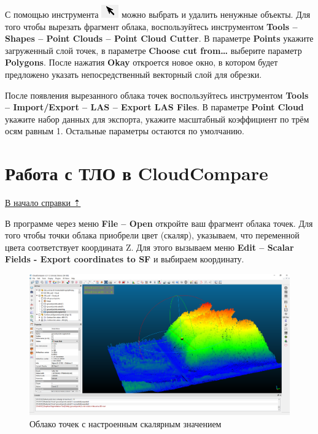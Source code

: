 \documentclass[
  12pt,
]{book}
\begin{document}
С помощью инструмента \includegraphics{images/Ref19/Pick.png} можно выбрать и удалить ненужные объекты. Для того чтобы вырезать фрагмент облака, воспользуйтесь инструментом \textbf{Tools -- Shapes -- Point Clouds -- Point Cloud Cutter}. В параметре \textbf{Points} укажите загруженный слой точек, в параметре \textbf{Choose cut from\ldots{}} выберите параметр \textbf{Polygons}. После нажатия \textbf{Okay} откроется новое окно, в котором будет предложено указать непосредственный векторный слой для обрезки.

После появления вырезанного облака точек воспользуйтесь инструментом \textbf{Tools -- Import/Export -- LAS -- Export LAS Files}. В параметре \textbf{Point Cloud} укажите набор данных для экспорта, укажите масштабный коэффициент по трём осям равным 1. Остальные параметры остаются по умолчанию.

\hypertarget{las-cloudcompare}{%
\section{Работа с ТЛО в CloudCompare}\label{las-cloudcompare}}

\protect\hyperlink{las}{В начало справки ⇡}

В программе через меню \textbf{File -- Open} откройте ваш фрагмент облака точек. Для того чтобы точки облака приобрели цвет (скаляр), указываем, что переменной цвета соответствует координата Z. Для этого вызываем меню \textbf{Edit -- Scalar Fields - Export coordinates to SF} и выбираем координату.

\begin{figure}
\centering
\includegraphics{images/Ref19/Colorize_Cloud.png}
\caption{Облако точек с настроенным скалярным значением}
\end{figure}
\end{document}
